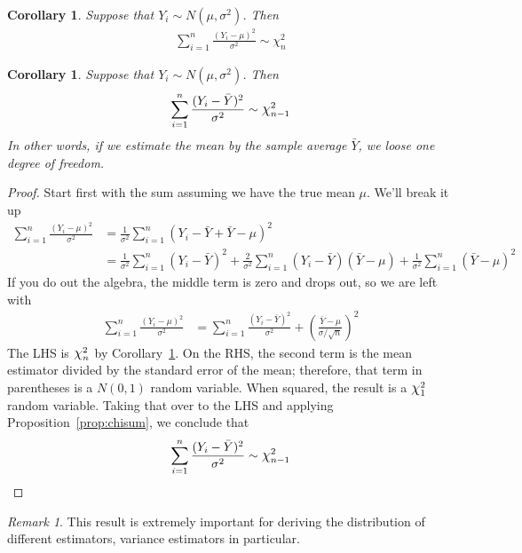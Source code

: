 \documentclass[12pt]{article}
\theoremstyle{plain}
\newtheorem{cor}[thm]{Corollary}
\theoremstyle{definition}
\theoremstyle{remark}
\newtheorem*{rmk}{Remark}
\newcommand*{\Chi}{\mbox{\large$\chi$}} %
\begin{document}
\begin{cor}
\label{cor:chimu}
Suppose that $Y_i \sim N(\mu,\sigma^2)$. Then
\begin{align*}
  \sum^n_{i=1} \frac{(Y_i-\mu)^2}{\sigma^2}  \sim \chi^2_n
\end{align*}
\end{cor}

\begin{cor}
Suppose that $Y_i \sim N(\mu,\sigma^2)$. Then
\begin{align*}
  \sum^n_{i=1} \frac{(Y_i-\bar{Y})^2}{\sigma^2}  \sim \Chi^2_{n-1}
\end{align*}
In other words, if we estimate the mean by the sample average $\bar{Y}$,
we loose one degree of freedom.
\end{cor}
\begin{proof}
Start first with the sum assuming we have the true mean $\mu$. We'll
break it up
\begin{align*}
	 \sum^n_{i=1} \frac{(Y_i-\mu)^2}{\sigma^2} &= \frac{1}{
	    \sigma^2} \sum^n_{i=1} (Y_i - \bar{Y}+ \bar{Y}-\mu)^2 \\
	    &= \frac{1}{\sigma^2} \sum^n_{i=1}  (Y_i - \bar{Y})^2
	    + \frac{2}{\sigma^2} \sum^n_{i=1} (Y_i-\bar{Y})(\bar{Y}-\mu)
	    + \frac{1}{\sigma^2} \sum^n_{i=1} (\bar{Y}-\mu)^2
\end{align*}
If you do out the algebra, the middle term is zero and drops out, so we
are left with
\begin{align*}
	 \sum^n_{i=1} \frac{(Y_i-\mu)^2}{\sigma^2}
	 &= \sum^n_{i=1}\frac{(Y_i - \bar{Y})^2 }{\sigma^2} +
	    \left(\frac{\bar{Y}-\mu }{\sigma /\sqrt{n}}\right)^2
\end{align*}
The LHS is $\Chi^2_n$ by Corollary~\ref{cor:chimu}.
On the RHS, the second term is the mean estimator divided by the
standard error of the mean; therefore, that term in parentheses is a
$N(0,1)$ random variable. When squared, the result is a $\Chi_1^2$
random variable. Taking that over to the LHS and applying
Proposition~\ref{prop:chisum}, we conclude that
\begin{align*}
  \sum^n_{i=1}\frac{(Y_i - \bar{Y})^2}{\sigma^2}
  \sim \Chi^2_{n-1}
\end{align*}
\end{proof}
\begin{rmk}
This result is extremely important for deriving the distribution of
different estimators, variance estimators in particular.
\end{rmk}
\end{document}

